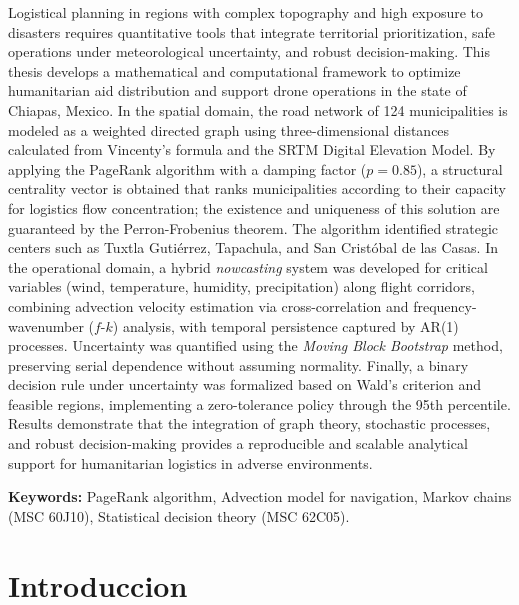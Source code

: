 \documentclass[
  spanish,
  us-letterpaper,
]{scrreprt}
\numberwithin{equation}{section}
\begin{document}

Logistical planning in regions with complex topography and high exposure
to disasters requires quantitative tools that integrate territorial
prioritization, safe operations under meteorological uncertainty, and
robust decision-making. This thesis develops a mathematical and
computational framework to optimize humanitarian aid distribution and
support drone operations in the state of Chiapas, Mexico. In the spatial
domain, the road network of 124 municipalities is modeled as a weighted
directed graph using three-dimensional distances calculated from
Vincenty's formula and the SRTM Digital Elevation Model. By applying the
PageRank algorithm with a damping factor (\(p=0.85\)), a structural
centrality vector is obtained that ranks municipalities according to
their capacity for logistics flow concentration; the existence and
uniqueness of this solution are guaranteed by the Perron-Frobenius
theorem. The algorithm identified strategic centers such as Tuxtla
Gutiérrez, Tapachula, and San Cristóbal de las Casas. In the operational
domain, a hybrid \emph{nowcasting} system was developed for critical
variables (wind, temperature, humidity, precipitation) along flight
corridors, combining advection velocity estimation via cross-correlation
and frequency-wavenumber (\(f\)-\(k\)) analysis, with temporal
persistence captured by AR(1) processes. Uncertainty was quantified
using the \emph{Moving Block Bootstrap} method, preserving serial
dependence without assuming normality. Finally, a binary decision rule
under uncertainty was formalized based on Wald's criterion and feasible
regions, implementing a zero-tolerance policy through the 95th
percentile. Results demonstrate that the integration of graph theory,
stochastic processes, and robust decision-making provides a reproducible
and scalable analytical support for humanitarian logistics in adverse
environments.

\textbf{Keywords:} PageRank algorithm, Advection model for navigation,
Markov chains (MSC 60J10), Statistical decision theory (MSC 62C05).


\chapter{Introduccion}\label{introduccion}
\end{document}
